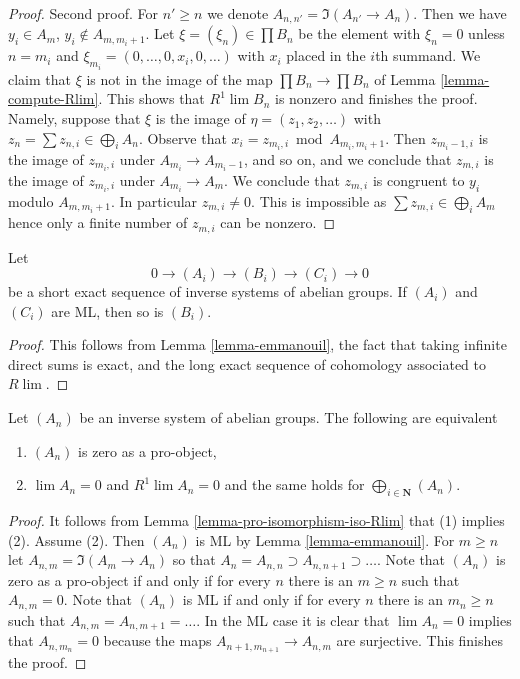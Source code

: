 \begin{proof}
\medskip\noindent
Second proof. For $n' \geq n$ we denote $A_{n, n'} = \Im(A_{n'} \to A_n)$.
Then we have $y_i \in A_m$, $y_i \not \in A_{m, m_i + 1}$.
Let $\xi = (\xi_n) \in \prod B_n$ be the element with
$\xi_n = 0$ unless $n = m_i$ and $\xi_{m_i} = (0, \ldots, 0, x_i, 0, \ldots)$
with $x_i$ placed in the $i$th summand. We claim that $\xi$ is not in the
image of the map $\prod B_n \to \prod B_n$ of Lemma \ref{lemma-compute-Rlim}.
This shows that $R^1\lim B_n$ is nonzero and finishes the proof.
Namely, suppose that $\xi$ is the image of $\eta = (z_1, z_2, \ldots)$
with $z_n = \sum z_{n, i} \in \bigoplus_i A_n$.
Observe that $x_i = z_{m_i, i} \bmod A_{m_i, m_i + 1}$.
Then $z_{m_i - 1, i}$ is the image of $z_{m_i, i}$ under
$A_{m_i} \to A_{m_i - 1}$, and so on, and we conclude that
$z_{m, i}$ is the image of $z_{m_i, i}$ under $A_{m_i} \to A_m$.
We conclude that $z_{m, i}$ is congruent to $y_i$ modulo
$A_{m, m_i + 1}$. In particular $z_{m, i} \not = 0$.
This is impossible as $\sum z_{m, i} \in \bigoplus_i A_m$
hence only a finite number of $z_{m, i}$ can be nonzero.
\end{proof}

\begin{lemma}
\label{lemma-Mittag-Leffler}
Let
$$
0 \to (A_i) \to (B_i) \to (C_i) \to 0
$$
be a short exact sequence of inverse systems of abelian groups.
If $(A_i)$ and $(C_i)$ are ML, then so is $(B_i)$.
\end{lemma}

\begin{proof}
This follows from Lemma \ref{lemma-emmanouil}, the fact that
taking infinite direct sums is exact, and the long exact sequence
of cohomology associated to $R\lim$.
\end{proof}

\begin{lemma}
\label{lemma-Rlim-zero-of-direct-sums}
Let $(A_n)$ be an inverse system of abelian groups.
The following are equivalent
\begin{enumerate}
\item $(A_n)$ is zero as a pro-object,
\item $\lim A_n = 0$ and $R^1\lim A_n = 0$ and
the same holds for $\bigoplus_{i \in \mathbf{N}} (A_n)$.
\end{enumerate}
\end{lemma}

\begin{proof}
It follows from Lemma \ref{lemma-pro-isomorphism-iso-Rlim}
that (1) implies (2). Assume (2).
Then $(A_n)$ is ML by Lemma \ref{lemma-emmanouil}.
For $m \geq n$ let $A_{n, m} = \Im(A_m \to A_n)$
so that $A_n = A_{n, n} \supset A_{n, n + 1} \supset \ldots$.
Note that $(A_n)$ is zero as a pro-object if and only if for every
$n$ there is an $m \geq n$ such that $A_{n, m} = 0$.
Note that $(A_n)$ is ML if and only if for every $n$ there is an $m_n \geq n$
such that $A_{n, m} = A_{n, m + 1} = \ldots$. In the ML case it is
clear that $\lim A_n = 0$ implies that $A_{n, m_n} = 0$
because the maps $A_{n + 1, m_{n + 1}} \to A_{n, m}$ are surjective.
This finishes the proof.
\end{proof}




